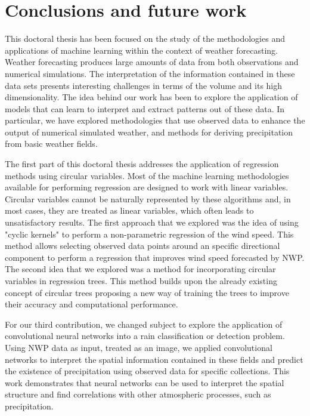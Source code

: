 
\chapter{Conclusions and future work} %

\label{Chapter3}

This doctoral thesis has been focused on the study of the methodologies and applications of machine learning within the context of weather forecasting. Weather forecasting produces large amounts of data from both observations and numerical simulations. The interpretation of the information contained in these data sets presents interesting challenges in terms of the volume and its high dimensionality. The idea behind our work has been to explore the application of models that can learn to interpret and extract patterns out of these data. In particular, we have explored methodologies that use observed data to enhance the output of numerical simulated weather, and methods for deriving precipitation from basic weather fields. 

\medskip

The first part of this doctoral thesis addresses the application of regression methods using circular variables. Most of the machine learning methodologies available for performing regression are designed to work with linear variables. Circular variables cannot be naturally represented by these algorithms and, in most cases, they are treated as linear variables, which often leads to unsatisfactory results. The first approach that we explored was the idea of using "cyclic kernels" to perform a non-parametric regression of the wind speed. This method allows selecting observed data points around an specific directional component to perform a regression that improves wind speed forecasted by NWP. The second idea that we explored was a method for incorporating circular variables in regression trees. This method builds upon the already existing concept of circular trees proposing a new way of training the trees to improve their accuracy and computational performance.

\medskip

For our third contribution, we changed subject to explore the application of convolutional neural networks into a rain classification or detection problem. Using NWP data as input, treated as an image, we applied convolutional networks to interpret the spatial information contained in these fields and predict the existence of precipitation using observed data for specific collections. This work demonstrates that neural networks can be used to interpret the spatial structure and find correlations with other atmospheric processes, such as precipitation.  

